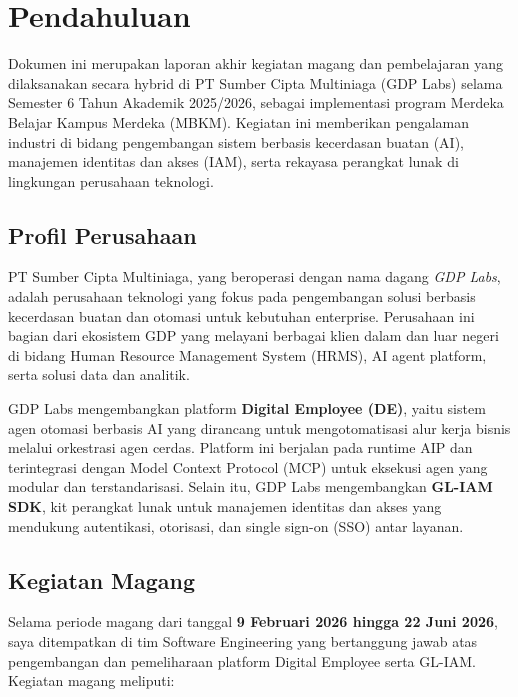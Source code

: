 \section{Pendahuluan}

Dokumen ini merupakan laporan akhir kegiatan magang dan pembelajaran yang dilaksanakan secara hybrid di PT Sumber Cipta Multiniaga (GDP Labs) selama Semester 6 Tahun Akademik 2025/2026, sebagai implementasi program Merdeka Belajar Kampus Merdeka (MBKM). Kegiatan ini memberikan pengalaman industri di bidang pengembangan sistem berbasis kecerdasan buatan (AI), manajemen identitas dan akses (IAM), serta rekayasa perangkat lunak di lingkungan perusahaan teknologi.

\subsection{Profil Perusahaan}

PT Sumber Cipta Multiniaga, yang beroperasi dengan nama dagang \textit{GDP Labs}, adalah perusahaan teknologi yang fokus pada pengembangan solusi berbasis kecerdasan buatan dan otomasi untuk kebutuhan enterprise. Perusahaan ini bagian dari ekosistem GDP yang melayani berbagai klien dalam dan luar negeri di bidang Human Resource Management System (HRMS), AI agent platform, serta solusi data dan analitik.

GDP Labs mengembangkan platform \textbf{Digital Employee (DE)}, yaitu sistem agen otomasi berbasis AI yang dirancang untuk mengotomatisasi alur kerja bisnis melalui orkestrasi agen cerdas. Platform ini berjalan pada runtime AIP dan terintegrasi dengan Model Context Protocol (MCP) untuk eksekusi agen yang modular dan terstandarisasi. Selain itu, GDP Labs mengembangkan \textbf{GL-IAM SDK}, kit perangkat lunak untuk manajemen identitas dan akses yang mendukung autentikasi, otorisasi, dan single sign-on (SSO) antar layanan.

\subsection{Kegiatan Magang}

Selama periode magang dari tanggal \textbf{9 Februari 2026 hingga 22 Juni 2026}, saya ditempatkan di tim Software Engineering yang bertanggung jawab atas pengembangan dan pemeliharaan platform Digital Employee serta GL-IAM. Kegiatan magang meliputi:

